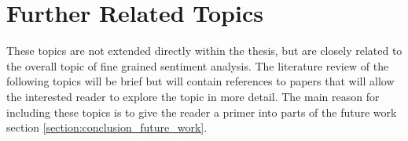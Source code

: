 








\section{Further Related Topics}
These topics are not extended directly within the thesis, but are closely related to the overall topic of fine grained sentiment analysis. The literature review of the following topics will be brief but will contain references to papers that will allow the interested reader to explore the topic in more detail. The main reason for including these topics is to give the reader a primer into parts of the future work section \ref{section:conclusion_future_work}.

